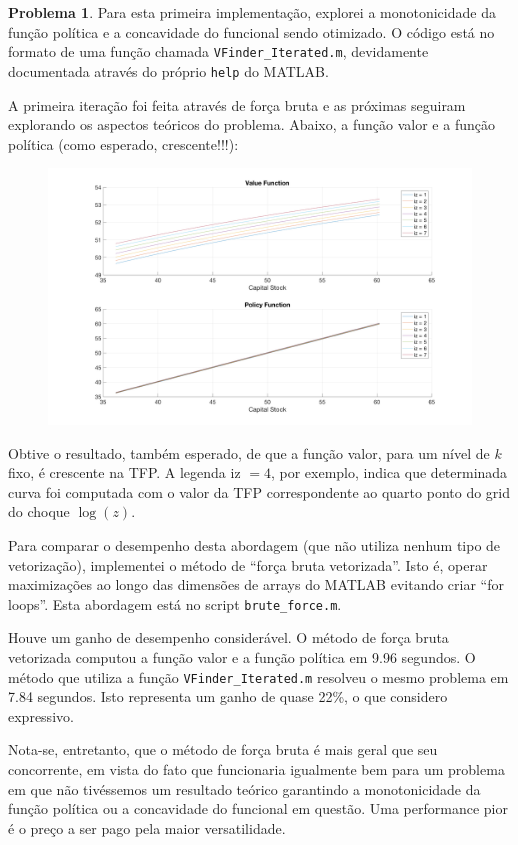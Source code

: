 \documentclass[11pt]{article}
\theoremstyle{definition}
\theoremstyle{definition}
\newtheorem{problema}{Problema}
\theoremstyle{solution}
\begin{document}
\begin{problema}
	Para esta primeira implementação, explorei a monotonicidade da função política e a concavidade do funcional sendo otimizado. O código está no formato de uma função chamada \texttt{VFinder\_Iterated.m}, devidamente documentada através do próprio \texttt{help} do MATLAB.
	
	A primeira iteração foi feita através de força bruta e as próximas seguiram explorando os aspectos teóricos do problema. Abaixo, a função valor e a função política (como esperado, crescente!!!):
	\begin{figure}[htb!]
		\centering
		\includegraphics[scale = 0.22]{problem3_V_vs_G}
	\end{figure}
	
	Obtive o resultado, também esperado, de que a função valor, para um nível de $k$ fixo, é crescente na TFP. A legenda iz $= 4$, por exemplo, indica que determinada curva foi computada com o valor da TFP correspondente ao quarto ponto do grid do choque $\log (z)$.
	
	Para comparar o desempenho desta abordagem (que não utiliza nenhum tipo de vetorização), implementei o método de ``força bruta vetorizada''. Isto é, operar maximizações ao longo das dimensões de arrays do MATLAB evitando criar ``for loops''. Esta abordagem está no script \texttt{brute\_force.m}.
	
	Houve um ganho de desempenho considerável. O método de força bruta vetorizada computou a função valor e a função política em 9.96 segundos. O método que utiliza a função \texttt{VFinder\_Iterated.m} resolveu o mesmo problema em 7.84 segundos. Isto representa um ganho de quase 22\%, o que considero expressivo. 
	
	Nota-se, entretanto, que o método de força bruta é mais geral que seu concorrente, em vista do fato que funcionaria igualmente bem para um problema em que não tivéssemos um resultado teórico garantindo a monotonicidade da função política ou a concavidade do funcional em questão. Uma performance pior é o preço a ser pago pela maior versatilidade.
	\end{problema}
	
\end{document}
